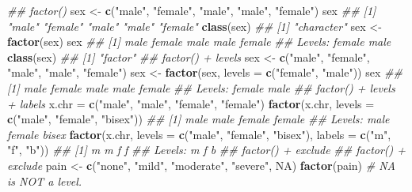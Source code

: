 \documentclass[
]{book}
\newenvironment{Shaded}{\begin{snugshade}}{\end{snugshade}}
\newcommand{\CommentTok}[1]{\textcolor[rgb]{0.56,0.35,0.01}{\textit{#1}}}
\newcommand{\DataTypeTok}[1]{\textcolor[rgb]{0.13,0.29,0.53}{#1}}
\newcommand{\KeywordTok}[1]{\textcolor[rgb]{0.13,0.29,0.53}{\textbf{#1}}}
\newcommand{\NormalTok}[1]{#1}
\newcommand{\OtherTok}[1]{\textcolor[rgb]{0.56,0.35,0.01}{#1}}
\newcommand{\StringTok}[1]{\textcolor[rgb]{0.31,0.60,0.02}{#1}}
\begin{document}
\begin{Shaded}
\begin{Highlighting}[]
\CommentTok{\#\# factor()}
\NormalTok{sex \textless{}{-}}\StringTok{ }\KeywordTok{c}\NormalTok{(}\StringTok{"male"}\NormalTok{, }\StringTok{"female"}\NormalTok{, }\StringTok{"male"}\NormalTok{, }\StringTok{"male"}\NormalTok{, }\StringTok{"female"}\NormalTok{)}
\NormalTok{sex}
\CommentTok{\#\# [1] "male"   "female" "male"   "male"   "female"}
\KeywordTok{class}\NormalTok{(sex)}
\CommentTok{\#\# [1] "character"}
\NormalTok{sex \textless{}{-}}\StringTok{ }\KeywordTok{factor}\NormalTok{(sex)}
\NormalTok{sex}
\CommentTok{\#\# [1] male   female male   male   female}
\CommentTok{\#\# Levels: female male}
\KeywordTok{class}\NormalTok{(sex)}
\CommentTok{\#\# [1] "factor"}
\CommentTok{\#\# factor() + levels}
\NormalTok{sex \textless{}{-}}\StringTok{ }\KeywordTok{c}\NormalTok{(}\StringTok{"male"}\NormalTok{, }\StringTok{"female"}\NormalTok{, }\StringTok{"male"}\NormalTok{, }\StringTok{"male"}\NormalTok{, }\StringTok{"female"}\NormalTok{)}
\NormalTok{sex \textless{}{-}}\StringTok{ }\KeywordTok{factor}\NormalTok{(sex, }\DataTypeTok{levels =} \KeywordTok{c}\NormalTok{(}\StringTok{"female"}\NormalTok{, }\StringTok{"male"}\NormalTok{))}
\NormalTok{sex}
\CommentTok{\#\# [1] male   female male   male   female}
\CommentTok{\#\# Levels: female male}
\CommentTok{\#\# factor() + levels + labels}
\NormalTok{x.chr =}\StringTok{ }\KeywordTok{c}\NormalTok{(}\StringTok{"male"}\NormalTok{, }\StringTok{"male"}\NormalTok{, }\StringTok{"female"}\NormalTok{, }\StringTok{"female"}\NormalTok{)}
\KeywordTok{factor}\NormalTok{(x.chr, }\DataTypeTok{levels =} \KeywordTok{c}\NormalTok{(}\StringTok{"male"}\NormalTok{, }\StringTok{"female"}\NormalTok{, }\StringTok{"bisex"}\NormalTok{))}
\CommentTok{\#\# [1] male   male   female female}
\CommentTok{\#\# Levels: male female bisex}
\KeywordTok{factor}\NormalTok{(x.chr, }\DataTypeTok{levels =} \KeywordTok{c}\NormalTok{(}\StringTok{"male"}\NormalTok{, }\StringTok{"female"}\NormalTok{, }\StringTok{"bisex"}\NormalTok{), }
              \DataTypeTok{labels =} \KeywordTok{c}\NormalTok{(}\StringTok{"m"}\NormalTok{, }\StringTok{"f"}\NormalTok{, }\StringTok{"b"}\NormalTok{))}
\CommentTok{\#\# [1] m m f f}
\CommentTok{\#\# Levels: m f b}
\CommentTok{\#\# factor() + exclude}
\CommentTok{\#\# factor() + exclude}
\NormalTok{pain \textless{}{-}}\StringTok{ }\KeywordTok{c}\NormalTok{(}\StringTok{"none"}\NormalTok{, }\StringTok{"mild"}\NormalTok{, }\StringTok{"moderate"}\NormalTok{, }\StringTok{"severe"}\NormalTok{, }\OtherTok{NA}\NormalTok{)}
\KeywordTok{factor}\NormalTok{(pain) }\CommentTok{\# NA is NOT a level.}

\end{Highlighting}
\end{Shaded}
\end{document}
